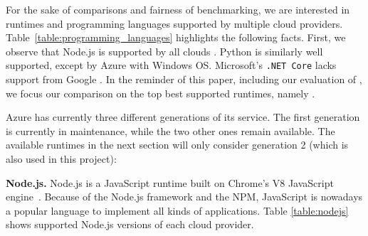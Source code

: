 For the sake of comparisons and fairness of benchmarking, we are interested in runtimes and programming languages supported by multiple cloud providers.  
Table~\ref{table:programming_languages} highlights the following facts.
First, we observe that Node.js is supported by all clouds . 
Python is similarly well supported, except by Azure with Windows \gls{OS}.
Microsoft's \texttt{.NET Core} lacks support from Google . 
In the reminder of this paper, including our evaluation of \sys, we focus our comparison on the top best supported runtimes, namely . 

\begin{remark}	
Azure has currently three different generations of its service. 
The first generation is currently in maintenance, while the two other ones remain available. 
The available runtimes in the next section will only consider generation 2 (which is also used in this project):
\end{remark}

\textbf{Node.js.} Node.js is a JavaScript runtime built on Chrome's V8 JavaScript engine~\cite{Nodejs}. 
Because of the Node.js framework and the \gls{NPM}, JavaScript is nowadays a popular language to implement all kinds of applications. 
Table \ref{table:nodejs} shows supported Node.js versions of each cloud provider. 

